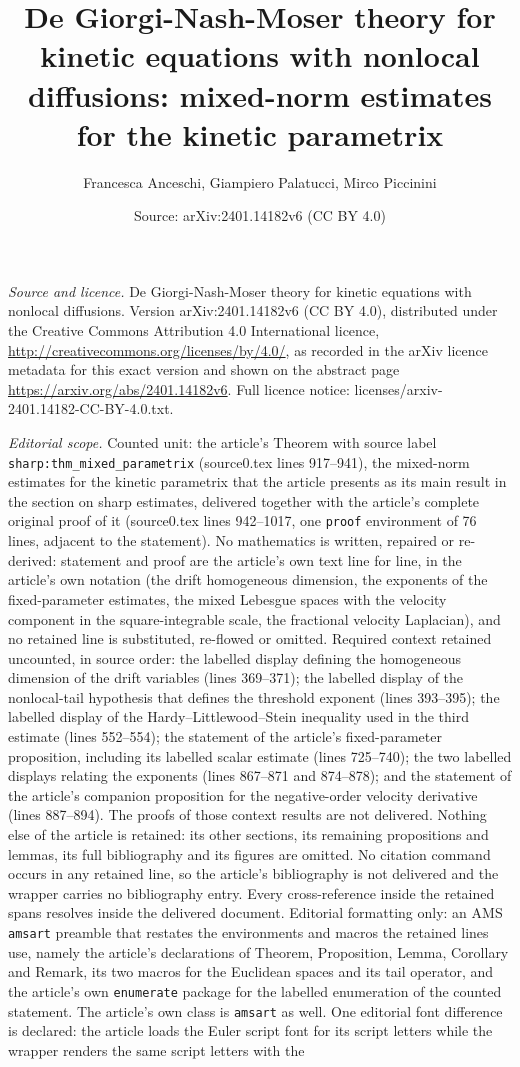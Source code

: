 \documentclass[10pt,a4paper]{amsart}
\title[De Giorgi-Nash-Moser theory for kinetic equations with nonlocal diffusions]{De Giorgi-Nash-Moser theory for kinetic equations with nonlocal diffusions: mixed-norm estimates for the kinetic parametrix}
\author{Francesca Anceschi, Giampiero Palatucci, Mirco Piccinini}
\date{Source: arXiv:2401.14182v6 (CC BY 4.0)}
\theoremstyle{plain}
\theoremstyle{remark}
\begin{document}
\maketitle
\noindent\emph{Source and licence.} De Giorgi-Nash-Moser theory for kinetic equations with nonlocal diffusions. Version arXiv:2401.14182v6 (CC BY 4.0), distributed under the Creative Commons Attribution 4.0 International licence, \url{http://creativecommons.org/licenses/by/4.0/}, as recorded in the arXiv licence metadata for this exact version and shown on the abstract page \url{https://arxiv.org/abs/2401.14182v6}. Full licence notice: licenses/arxiv-2401.14182-CC-BY-4.0.txt.\par\smallskip

\noindent\textit{Editorial scope.} Counted unit: the article's Theorem with source label \texttt{sharp:thm\_mixed\_parametrix} (source0.tex lines 917--941), the mixed-norm estimates for the kinetic parametrix that the article presents as its main result in the section on sharp estimates, delivered together with the article's complete original proof of it (source0.tex lines 942--1017, one \texttt{proof} environment of 76 lines, adjacent to the statement). No mathematics is written, repaired or re-derived: statement and proof are the article's own text line for line, in the article's own notation (the drift homogeneous dimension, the exponents of the fixed-parameter estimates, the mixed Lebesgue spaces with the velocity component in the square-integrable scale, the fractional velocity Laplacian), and no retained line is substituted, re-flowed or omitted. Required context retained uncounted, in source order: the labelled display defining the homogeneous dimension of the drift variables (lines 369--371); the labelled display of the nonlocal-tail hypothesis that defines the threshold exponent (lines 393--395); the labelled display of the Hardy--Littlewood--Stein inequality used in the third estimate (lines 552--554); the statement of the article's fixed-parameter proposition, including its labelled scalar estimate (lines 725--740); the two labelled displays relating the exponents (lines 867--871 and 874--878); and the statement of the article's companion proposition for the negative-order velocity derivative (lines 887--894). The proofs of those context results are not delivered. Nothing else of the article is retained: its other sections, its remaining propositions and lemmas, its full bibliography and its figures are omitted. No citation command occurs in any retained line, so the article's bibliography is not delivered and the wrapper carries no bibliography entry. Every cross-reference inside the retained spans resolves inside the delivered document. Editorial formatting only: an AMS \texttt{amsart} preamble that restates the environments and macros the retained lines use, namely the article's declarations of Theorem, Proposition, Lemma, Corollary and Remark, its two macros for the Euclidean spaces and its tail operator, and the article's own \texttt{enumerate} package for the labelled enumeration of the counted statement. The article's own class is \texttt{amsart} as well. One editorial font difference is declared: the article loads the Euler script font for its script letters while the wrapper renders the same script letters with the 
\end{document}
